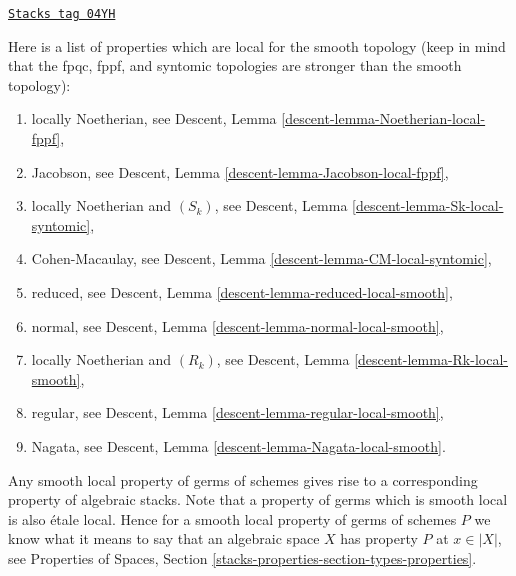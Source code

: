 \begin{remark}
\label{stacks-properties-remark-list-properties-local-smooth-topology}
\href{https://stacks.math.columbia.edu/tag/04YH}{\texttt{Stacks tag 04YH}}

Here is a list of properties which are local for the smooth topology
(keep in mind that the fpqc, fppf, and syntomic topologies are
stronger than the smooth topology):
\begin{enumerate}
\item locally Noetherian, see
Descent, Lemma \ref{descent-lemma-Noetherian-local-fppf},
\item Jacobson, see
Descent, Lemma \ref{descent-lemma-Jacobson-local-fppf},
\item locally Noetherian and $(S_k)$, see
Descent, Lemma \ref{descent-lemma-Sk-local-syntomic},
\item Cohen-Macaulay, see
Descent, Lemma \ref{descent-lemma-CM-local-syntomic},
\item reduced, see
Descent, Lemma \ref{descent-lemma-reduced-local-smooth},
\item normal, see
Descent, Lemma \ref{descent-lemma-normal-local-smooth},
\item locally Noetherian and $(R_k)$, see
Descent, Lemma \ref{descent-lemma-Rk-local-smooth},
\item regular, see
Descent, Lemma \ref{descent-lemma-regular-local-smooth},
\item Nagata, see
Descent, Lemma \ref{descent-lemma-Nagata-local-smooth}.
\end{enumerate}
\end{remark}

Any smooth local property of germs of schemes gives rise to a corresponding
property of algebraic stacks. Note that a property of germs which is smooth
local is also \'etale local. Hence for a smooth local property of germs of
schemes $P$ we know what it means to say that an algebraic space $X$ has
property $P$ at $x \in |X|$, see
Properties of Spaces, Section \ref{stacks-properties-section-types-properties}.

